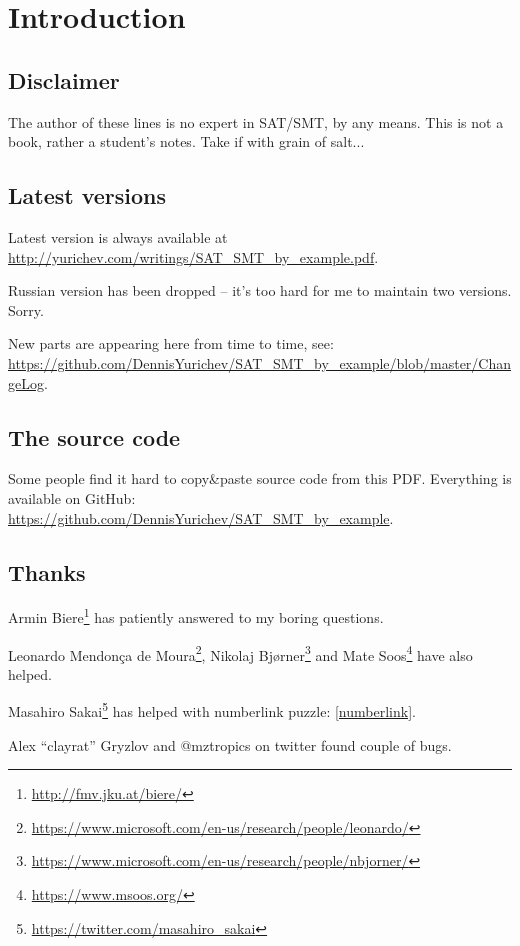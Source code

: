 \section{Introduction}

\subsection{Disclaimer}

The author of these lines is no expert in SAT/SMT, by any means.
This is not a book, rather a student's notes.
Take if with grain of salt...

\subsection{Latest versions}

Latest version is always available at \url{http://yurichev.com/writings/SAT_SMT_by_example.pdf}.

Russian version has been dropped -- it's too hard for me to maintain two versions. Sorry.

New parts are appearing here from time to time, see: \url{https://github.com/DennisYurichev/SAT_SMT_by_example/blob/master/ChangeLog}.

\subsection{The source code}

Some people find it hard to copy\&paste source code from this PDF.
Everything is available on GitHub: \url{https://github.com/DennisYurichev/SAT_SMT_by_example}.

\subsection{Thanks}

Armin Biere\footnote{\url{http://fmv.jku.at/biere/}} has patiently answered to my boring questions.

Leonardo Mendonça de Moura\footnote{\url{https://www.microsoft.com/en-us/research/people/leonardo/}},
Nikolaj Bjørner\footnote{\url{https://www.microsoft.com/en-us/research/people/nbjorner/}}
and Mate Soos\footnote{\url{https://www.msoos.org/}} have also helped.

Masahiro Sakai\footnote{\url{https://twitter.com/masahiro_sakai}} has helped with numberlink puzzle: \ref{numberlink}.

Alex ``clayrat'' Gryzlov and @mztropics on twitter found couple of bugs.

